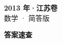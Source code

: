 \documentclass[zihao=-4, a4paper]{ctexart}
\begin{document}
\begin{center}
  {\Large\bfseries 2013 年·江苏卷}\\[4pt]
  {\large 数学 · 简答版}
\end{center}
\medskip
{}

\clearpage
{}
\begin{center}{\Large\bfseries 答案速查}\end{center}
\medskip

\end{document}
